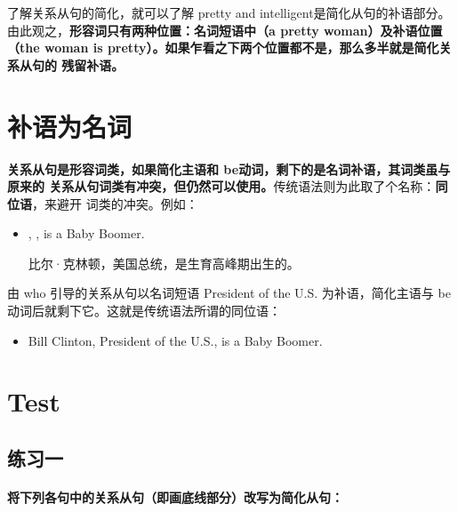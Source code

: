 了解关系从句的简化，就可以了解 pretty and intelligent是简化从句的补语部分。
由此观之，\textbf{形容词只有两种位置：名词短语中（a pretty woman）及补语位置（the
  woman is pretty）。如果乍看之下两个位置都不是，那么多半就是简化关系从句的
  残留补语。}

\section{补语为名词}

\textbf{关系从句是形容词类，如果简化主语和 be动词，剩下的是名词补语，其词类虽与原来的
关系从句词类有冲突，但仍然可以使用。}传统语法则为此取了个名称：\textbf{同位语}，来避开
词类的冲突。例如：
\begin{itemize}
\item {}, ,
  is a Baby Boomer.

  比尔·克林顿，美国总统，是生育高峰期出生的。
\end{itemize}
由 who 引导的关系从句以名词短语 President of the U.S. 为补语，简化主语与
be 动词后就剩下它。这就是传统语法所谓的同位语：
\begin{itemize}
\item Bill Clinton, President of the U.S., is a Baby Boomer.
\end{itemize}

\section{Test}

\subsection{练习一}

\paragraph{将下列各句中的关系从句（即画底线部分）改写为简化从句：}

